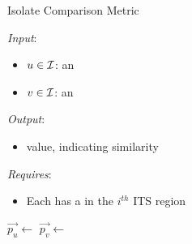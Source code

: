 \begin{algorithm}[H]
\caption{Isolate Comparison Metric}\label{alg:compare}
\textit{Input}:
    \begin{itemize}
    \item $u\in\mathcal{I}{}$: an \isol{}
    \item $v\in\mathcal{I}{}$: an \isol{}
    \end{itemize}
\textit{Output}:
    \begin{itemize}
    \item \R{} value, indicating similarity
    \end{itemize}
\textit{Requires}:
    \begin{itemize}
    \item Each \isol{} has a \pyro{} in the $i^{th}$ ITS region
    \end{itemize}

\begin{algorithmic}[1]
\State $\vec{p_u} \leftarrow$ 
\State $\vec{p_v} \leftarrow$ 
\State \Return {}
\EndProcedure
\end{algorithmic}
\end{algorithm}